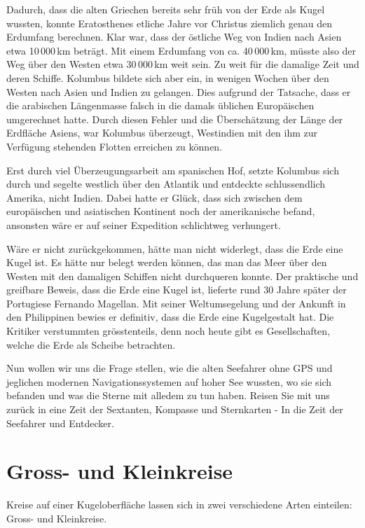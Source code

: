 \begin{refsection}
Dadurch, dass die alten Griechen bereits sehr früh von der Erde als Kugel wussten, konnte Eratosthenes etliche Jahre vor Christus ziemlich genau den Erdumfang berechnen. Klar war, dass der östliche Weg von Indien nach Asien etwa 10\,000\,km beträgt. Mit einem Erdumfang von ca. 40\,000\,km, müsste also der Weg über den Westen etwa 30\,000\,km weit sein.
Zu weit für die damalige Zeit und deren Schiffe. Kolumbus bildete sich aber ein, in wenigen Wochen über den Westen nach Asien und Indien zu gelangen. Dies aufgrund der Tatsache, dass er die arabischen Längenmasse falsch in die damals üblichen Europäischen umgerechnet hatte.
Durch diesen Fehler und die Überschätzung der Länge der Erdfläche Asiens, war Kolumbus überzeugt, Westindien mit den ihm zur Verfügung stehenden Flotten erreichen zu können.

Erst durch viel Überzeugungsarbeit am spanischen Hof, setzte Kolumbus sich  durch und segelte westlich über den Atlantik und entdeckte schlussendlich Amerika, nicht Indien.
Dabei hatte er Glück, dass sich zwischen dem europäischen und asiatischen Kontinent noch der amerikanische befand, ansonsten wäre er auf seiner Expedition schlichtweg verhungert.

Wäre er nicht zurückgekommen, hätte man nicht widerlegt, dass die Erde eine Kugel ist. Es hätte nur belegt werden können, das man das Meer über den Westen mit den damaligen Schiffen nicht durchqueren konnte.
Der praktische und greifbare Beweis, dass die Erde eine Kugel ist, lieferte rund 30 Jahre später der Portugiese Fernando Magellan. Mit seiner Weltumsegelung und der Ankunft in den Philippinen bewies er definitiv, dass die Erde eine Kugelgestalt hat. Die Kritiker verstummten grösstenteils, denn noch heute gibt es Gesellschaften, welche die Erde als Scheibe betrachten.

Nun wollen wir uns die Frage stellen, wie die alten Seefahrer ohne GPS und jeglichen modernen Navigationssystemen auf hoher See wussten, wo sie sich befanden und was die Sterne mit alledem zu tun haben. Reisen Sie mit uns zurück in eine Zeit der Sextanten, Kompasse und Sternkarten - In die Zeit der Seefahrer und Entdecker.


\section{Gross- und Kleinkreise}
Kreise auf einer Kugeloberfläche lassen sich in zwei verschiedene Arten einteilen: Gross- und Kleinkreise. 


\end{refsection}

